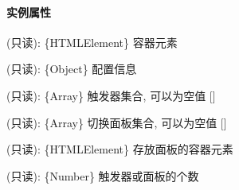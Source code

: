 \documentclass[letterpaper,10pt,english]{sphinxmanual}
\begin{document}
\paragraph{实例属性}
\label{api/component/switchable/switchable:id3}

\begin{fulllineitems}
\label{api/component/switchable/switchable:Switchable.Switchable.container}
(只读): \{HTMLElement\} 容器元素

\end{fulllineitems}



\begin{fulllineitems}
\label{api/component/switchable/switchable:Switchable.Switchable.config}
(只读): \{Object\} 配置信息

\end{fulllineitems}



\begin{fulllineitems}
(只读): \{Array\} 触发器集合, 可以为空值 {[}{]}

\end{fulllineitems}



\begin{fulllineitems}
(只读): \{Array\} 切换面板集合,  可以为空值 {[}{]}

\end{fulllineitems}



\begin{fulllineitems}
\label{api/component/switchable/switchable:Switchable.Switchable.content}
(只读): \{HTMLElement\} 存放面板的容器元素

\end{fulllineitems}



\begin{fulllineitems}
\label{api/component/switchable/switchable:Switchable.Switchable.length}
(只读): \{Number\} 触发器或面板的个数

\end{fulllineitems}
\end{document}
